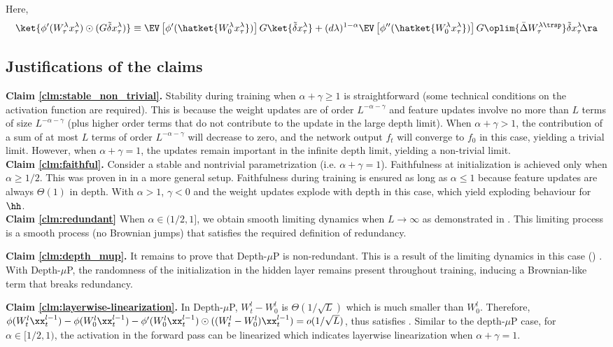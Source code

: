 Here, 
\[
\ket{\phi'(W_{\tau}^{\lambda}x_{\tau}^{\lambda})\odot(G\tilde\delta x_{\tau}^{\lambda})}\equiv\EV\left[\phi'(\hatket{W_{0}^{\lambda}x_{\tau}^{\lambda}})\right]G\ket{\tilde\delta x_{\tau}^{\lambda}}+(d\lambda)^{1-\alpha}\EV\left[\phi''(\hatket{W_{0}^{\lambda}x_{\tau}^{\lambda}})\right]G\oplim{\bar{\Delta}W_{\tau}^{\lambda\trsp}}\tilde\delta x_{\tau}^{\lambda}\ra
\]

\subsection{Justifications of the claims}\label{sec:claim_justifications}
\textbf{Claim \ref{clm:stable_non_trivial}.} Stability during training when $\alpha+\gamma\geq1$ is straightforward (some technical conditions on the activation function are required). This is because the weight updates are of order $L^{-\alpha-\gamma}$ and feature updates involve no more than $L$ terms of size $L^{-\alpha-\gamma}$ (plus higher order terms that do not contribute to the update in the large depth limit). When $\alpha +\gamma >1$, the contribution of a sum of at most $L$ terms of order $L^{-\alpha - \gamma}$ will decrease to zero, and the network output $f_t$ will converge to $f_0$ in this case, yielding a trivial limit. However, when $\alpha + \gamma=1$, the updates remain important in the infinite depth limit, yielding a non-trivial limit.\\

\textbf{Claim \ref{clm:faithful}.} Consider a stable and nontrivial parametrization (i.e. $\alpha+\gamma=1$). Faithfulness at initialization is achieved only when $\alpha\geq 1/2$. This was proven in \cite{hayou21stable} in a more general setup. Faithfulness during training is ensured as long as $\alpha\leq 1$ because feature updates are always $\Theta(1)$ in depth. With $\alpha>1$, $\gamma<0$ and the weight updates explode with depth in this case, which yield exploding behaviour for $\hh$.\\

\textbf{Claim \ref{clm:redundant}} When $\alpha \in (1/2,1]$, we obtain smooth limiting dynamics when $L\to \infty$ as demonstrated in . This limiting process is a smooth process (no Brownian jumps) that satisfies the required definition of redundancy.

\textbf{Claim \ref{clm:depth_mup}.} It remains to prove that Depth-$\mu$P is non-redundant. This is a result of the limiting dynamics in this case () . With Depth-$\mu$P, the randomness of the initialization in the hidden layer remains present throughout training, inducing a Brownian-like term that breaks redundancy. 

\textbf{Claim \ref{clm:layerwise-linearization}.} In Depth-$\mu$P, $W_t^l-W_0^l$ is $\Theta(1/\sqrt L)$ which is much smaller than $W_0^l$. Therefore, $\phi(W^l_t\xx_t^{l-1})-\phi( W^l_0\xx_t^{l-1}) - \phi'(W_0^l\xx_t^{l-1})\odot ((W_t^l-W_0^l)\xx_t^{l-1})=o(1/\sqrt L)$, thus satisfies .
Similar to the depth-$\mu$P case, for $\alpha \in [1/2,1)$, the activation in the forward pass can be linearized which indicates layerwise linearization when $\alpha+\gamma=1$.

